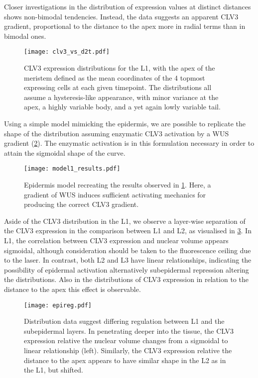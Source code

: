 Closer investigations in the distribution of expression
values at distinct distances shows non-bimodal tendencies. Instead, the data
suggests an apparent CLV3 gradient, proportional to the distance to the apex
more in radial terms than in bimodal ones.

\begin{figure}[H]
  \centering
\texttt{[image: clv3\_vs\_d2t.pdf]}
  \caption[CLV3 distributions]{CLV3 expression distributions for the L1, with the apex of the
    meristem defined as the mean coordinates of the 4 topmost expressing cells
    at each given timepoint. The distributions all assume a hysteresis-like
    appearance, with minor variance at the apex, a highly variable body, and a
    yet again lowly variable tail.}
  \label{fig:clv3d2t}
\end{figure}

Using a simple model mimicking the epidermis, we are possible to
replicate the shape of the distribution assuming enzymatic CLV3 activation by a WUS gradient
(\cref{fig:model1}). The enzymatic activation is in this formulation necessary in order to
attain the sigmoidal shape of the curve.

\begin{figure}[H]
  \centering
  \texttt{[image: model1\_results.pdf]}
  \caption[Epidermis model]{Epidermis model recreating the results observed in
    \cref{fig:clv3d2t}. Here, a gradient of WUS induces sufficient
    activating mechanics for producing the correct CLV3 gradient.}
  \label{fig:model1}
\end{figure}

Aside of the CLV3 distribution in the L1, we observe a layer-wise separation of
the CLV3 expression in the comparison between
L1 and L2, as visualised in \cref{fig:epireg}. In L1, the correlation between
CLV3 expression and nuclear volume appears sigmoidal, although consideration
should be taken to the fluorescence ceiling due to the laser. In contrast, both
L2 and L3 have linear relationships, indicating the possibility of epidermal
activation alternatively subepidermal repression altering the distributions.
Also in the distributions of CLV3 expression in relation to the distance to the
apex this effect is observable.

\begin{figure}[H]
  \centering
  \texttt{[image: epireg.pdf]}
  \caption[Cues of epidermal regulation]{Distribution data suggest differing
    regulation between L1 and the subepidermal layers. In penetrating deeper
    into the tissue, the CLV3 expression relative the nuclear volume changes
    from a sigmoidal to linear relationship (left). Similarly, the CLV3
    expression relative the distance to the apex appears to have similar shape
    in the L2 as in the L1,
    but shifted.}
  \label{fig:epireg}
\end{figure}

